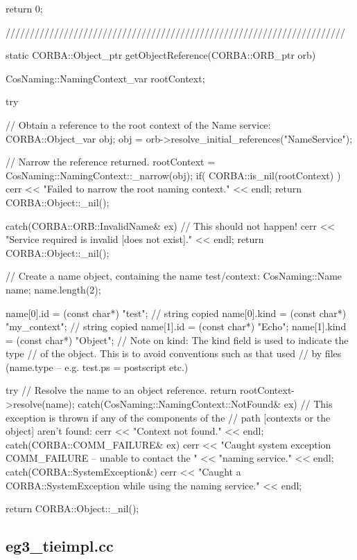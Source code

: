 \documentclass[11pt,twoside,a4paper]{book}
\begin{document}
\begin{cxxlisting}
{  return 0;
}

//////////////////////////////////////////////////////////////////////

static CORBA::Object_ptr
getObjectReference(CORBA::ORB_ptr orb)
{
  CosNaming::NamingContext_var rootContext;
  
  try {
    // Obtain a reference to the root context of the Name service:
    CORBA::Object_var obj;
    obj = orb->resolve_initial_references("NameService");

    // Narrow the reference returned.
    rootContext = CosNaming::NamingContext::_narrow(obj);
    if( CORBA::is_nil(rootContext) ) {
      cerr << "Failed to narrow the root naming context." << endl;
      return CORBA::Object::_nil();
    }
  }
  catch(CORBA::ORB::InvalidName& ex) {
    // This should not happen!
    cerr << "Service required is invalid [does not exist]." << endl;
    return CORBA::Object::_nil();
  }

  // Create a name object, containing the name test/context:
  CosNaming::Name name;
  name.length(2);

  name[0].id   = (const char*) "test";       // string copied
  name[0].kind = (const char*) "my_context"; // string copied
  name[1].id   = (const char*) "Echo";
  name[1].kind = (const char*) "Object";
  // Note on kind: The kind field is used to indicate the type
  // of the object. This is to avoid conventions such as that used
  // by files (name.type -- e.g. test.ps = postscript etc.)

  try {
    // Resolve the name to an object reference.
    return rootContext->resolve(name);
  }
  catch(CosNaming::NamingContext::NotFound& ex) {
    // This exception is thrown if any of the components of the
    // path [contexts or the object] aren't found:
    cerr << "Context not found." << endl;
  }
  catch(CORBA::COMM_FAILURE& ex) {
    cerr << "Caught system exception COMM_FAILURE -- unable to contact the "
         << "naming service." << endl;
  }
  catch(CORBA::SystemException&) {
    cerr << "Caught a CORBA::SystemException while using the naming service."
	 << endl;
  }

  return CORBA::Object::_nil();
}
\end{cxxlisting}


\clearpage
\subsection{eg3\_tieimpl.cc}
\end{document}
